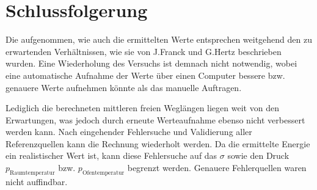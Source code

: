 \section{Schlussfolgerung}
	
	Die aufgenommen, wie auch die ermittelten Werte entsprechen weitgehend den zu erwartenden Verhältnissen, wie sie von J.Franck und G.Hertz beschrieben wurden.	 
	Eine Wiederholung des Versuchs ist demnach nicht notwendig, wobei eine automatische Aufnahme der Werte über einen Computer bessere bzw. genauere Werte aufnehmen könnte als das manuelle Auftragen. 

	Lediglich die berechneten mittleren freien Weglängen liegen weit von den Erwartungen, was jedoch durch erneute Werteaufnahme ebenso nicht verbessert werden kann.
	Nach eingehender Fehlersuche und Validierung aller Referenzquellen kann die Rechnung wiederholt werden.
	Da die ermittelte Energie ein realistischer Wert ist, kann diese Fehlersuche auf das $\sigma$ sowie den Druck $p_\text{Raumtemperatur}$ bzw. $p_\text{Ofentemperatur}$ begrenzt werden.
	Genauere Fehlerquellen waren nicht auffindbar.
